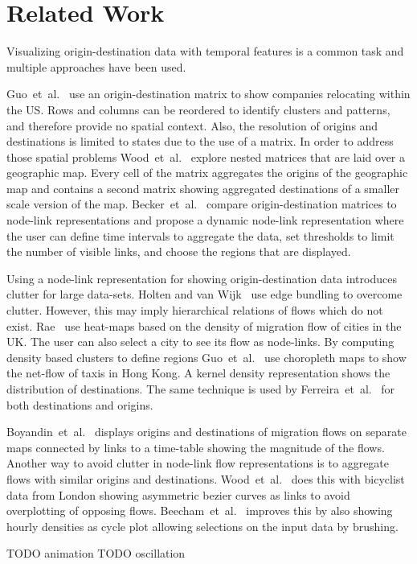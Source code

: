 \documentclass[a4paper,twocolumn]{article}
\author{Josua Krause}
\begin{document}
\section*{Related Work}
Visualizing origin-destination data with temporal features
is a common task and multiple approaches have been used.

Guo~et~al.~\cite{Guo2006} use an origin-destination matrix
to show companies relocating within the US.
Rows and columns can be reordered to identify clusters
and patterns, and therefore provide no spatial context.
Also, the resolution of origins and destinations is limited
to states due to the use of a matrix.
In order to address those spatial problems
Wood~et~al.~\cite{Wood2002} explore nested matrices
that are laid over a geographic map.
Every cell of the matrix aggregates the origins
of the geographic map and contains
a second matrix showing aggregated destinations of
a smaller scale version of the map.
Becker~et~al.~\cite{Becker1995} compare
origin-destination matrices to node-link representations
and propose a dynamic node-link representation
where the user can define time intervals to aggregate the data,
set thresholds to limit the number of visible links,
and choose the regions that are displayed.

Using a node-link representation for showing origin-destination
data introduces clutter for large data-sets.
Holten and van Wijk~\cite{Holten2009} use edge bundling
to overcome clutter. However, this may imply hierarchical
relations of flows which do not exist.
Rae~\cite{Rae2009} use heat-maps based on
the density of migration flow of cities in the UK.
The user can also select a city to see its flow as node-links.
By computing density based clusters to define regions
Guo~et~al.~\cite{Guo2012} use choropleth maps to show
the net-flow of taxis in Hong Kong.
A kernel density representation shows the distribution
of destinations.
The same technique is used by Ferreira~et~al.~\cite{Ferreira2013}
for both destinations and origins.

Boyandin~et~al.~\cite{Boyandin2011} displays origins and
destinations of migration flows on separate maps connected
by links to a time-table showing the magnitude of the flows.
Another way to avoid clutter in node-link
flow representations is to aggregate flows with
similar origins and destinations.
Wood~et~al.~\cite{Wood2011} does this with bicyclist data
from London showing asymmetric bezier curves as links to avoid
overplotting of opposing flows.
Beecham~et~al.~\cite{Beecham2012} improves
this by also showing hourly densities as cycle
plot allowing selections on the input data by brushing.

TODO animation
TODO oscillation




\end{document}
